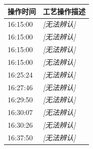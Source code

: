 \documentclass[UTF8,10pt,a4paper,fontset=fandol]{ctexart}
\newcommand{\fieldvalue}[1]{#1}
\begin{document}
\small
\begin{tabularx}{\textwidth}{@{}lX@{}}
\textbf{操作时间} & \textbf{工艺操作描述} \\ \hline
\fieldvalue{16:15:00} &
\fieldvalue{\textit{[无法辨认]}} \\

\fieldvalue{16:15:00} &
\fieldvalue{\textit{[无法辨认]}} \\

\fieldvalue{16:15:00} &
\fieldvalue{\textit{[无法辨认]}} \\

\fieldvalue{16:15:00} &
\fieldvalue{\textit{[无法辨认]}} \\

\fieldvalue{16:25:24} &
\fieldvalue{\textit{[无法辨认]}} \\

\fieldvalue{16:27:46} &
\fieldvalue{\textit{[无法辨认]}} \\

\fieldvalue{16:29:50} &
\fieldvalue{\textit{[无法辨认]}} \\

\fieldvalue{16:30:07} &
\fieldvalue{\textit{[无法辨认]}} \\

\fieldvalue{16:30:26} &
\fieldvalue{\textit{[无法辨认]}} \\

\fieldvalue{16:37:50} &
\fieldvalue{\textit{[无法辨认]}} \\


\end{tabularx}
\end{document}
